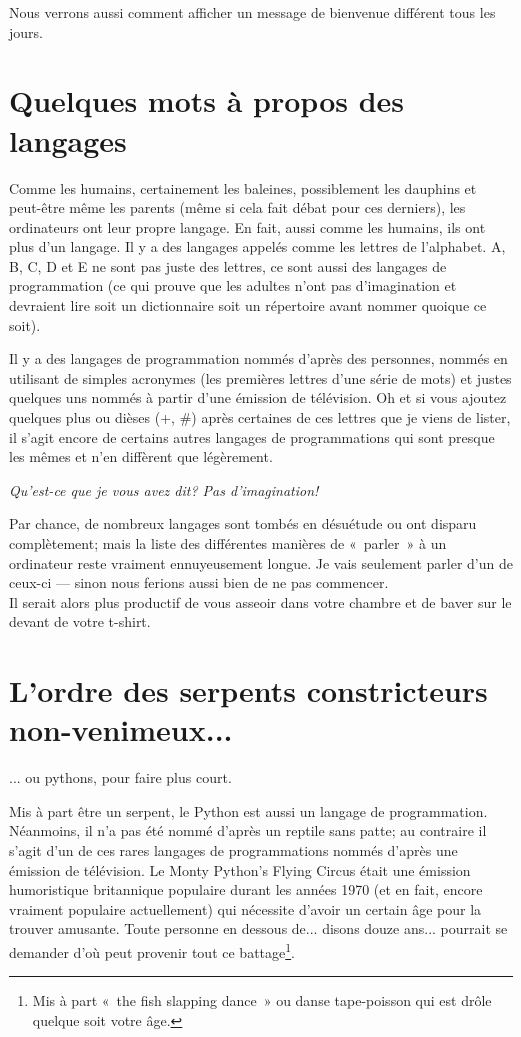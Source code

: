 Nous verrons aussi comment afficher un message de bienvenue différent tous les jours.

\section{Quelques mots à propos des langages}
Comme les humains, certainement les baleines, possiblement les dauphins et peut-être même les parents (même si cela fait débat pour ces derniers), les ordinateurs ont leur propre langage. En fait, aussi comme les humains, ils ont plus d'un langage. Il y a des langages appelés comme les lettres de l'alphabet. A, B, C, D et E ne sont pas juste des lettres, ce sont aussi des langages de programmation (ce qui prouve que les adultes n'ont pas d'imagination et devraient lire soit un dictionnaire soit un répertoire avant nommer quoique ce soit). 

Il y a des langages de programmation nommés d'après des personnes, nommés en utilisant de simples acronymes (les premières lettres d'une série de mots) et justes quelques uns nommés à partir d'une émission de télévision. Oh et si vous ajoutez quelques plus ou dièses (+, \#) après certaines de ces lettres que je viens de lister, il s'agit encore de certains autres langages de programmations qui sont presque les mêmes et n'en diffèrent que légèrement.

\bigskip
\emph{Qu'est-ce que je vous avez dit? Pas d'imagination!}

\bigskip
Par chance, de nombreux langages sont tombés en désuétude ou ont disparu complètement; mais la liste des différentes manières de «~parler~» à un ordinateur reste vraiment ennuyeusement longue. Je vais seulement parler d'un de ceux-ci --- sinon nous ferions aussi bien de ne pas commencer.\\


Il serait alors plus productif de vous asseoir dans votre chambre et de baver sur le devant de votre t-shirt.

\section{L'ordre des serpents constricteurs non-venimeux...}
... ou pythons, pour faire plus court.

\bigskip
Mis à part être un serpent, le Python est aussi un langage de programmation. Néanmoins, il n'a pas été nommé d'après un reptile sans patte; au contraire il s'agit d'un de ces rares langages de programmations nommés d'après une émission de télévision. Le Monty Python's Flying Circus était une émission humoristique britannique populaire durant les années 1970 (et en fait, encore vraiment populaire actuellement) qui nécessite d'avoir un certain âge pour la trouver amusante. Toute personne en dessous de... disons douze ans... pourrait se demander d'où peut provenir tout ce battage\footnote{Mis à part «~the fish slapping dance~» ou danse tape-poisson qui est drôle quelque soit votre âge.}.

